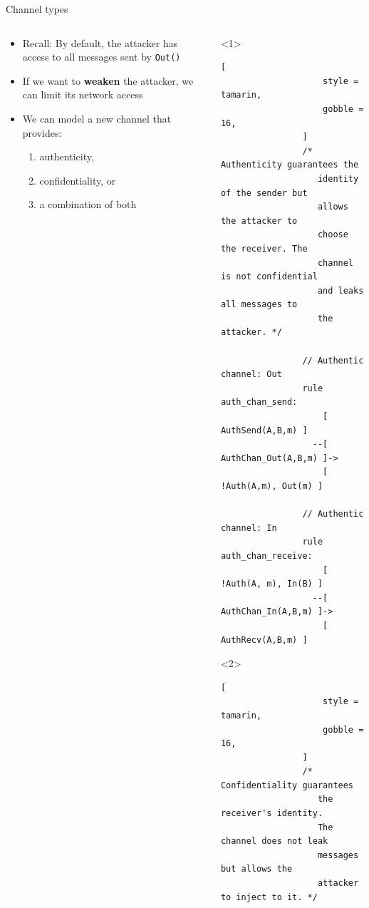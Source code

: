 \documentclass[11pt,aspectratio=169]{beamer}
\begin{document}
\begin{frame}[t,fragile]{Channel types}
    \begin{columns}[T]
        \begin{column}{0.55\textwidth}
            \begin{itemize}
                \item Recall: By default, the attacker has access to all 
                      messages sent by \texttt{Out()}
                \item If we want to \textbf{weaken} the attacker, we can limit 
                      its network access
                \item We can model a new channel that provides:
                \begin{enumerate}
                    \item<1-> authenticity,
                    \item<2-> confidentiality, or
                    \item<3-> a combination of both
                \end{enumerate}
            \end{itemize}
        \end{column}
        \begin{column}{0.45\textwidth}
            \begin{onlyenv}<1>
                \begin{lstlisting}[
                    style = tamarin,
                    gobble = 16,
                ]
                /* Authenticity guarantees the
                   identity of the sender but 
                   allows the attacker to
                   choose the receiver. The
                   channel is not confidential
                   and leaks all messages to
                   the attacker. */

                // Authentic channel: Out
                rule auth_chan_send:
                    [ AuthSend(A,B,m) ]
                  --[ AuthChan_Out(A,B,m) ]->
                    [ !Auth(A,m), Out(m) ]
  
                // Authentic channel: In
                rule auth_chan_receive:
                    [ !Auth(A, m), In(B) ]
                  --[ AuthChan_In(A,B,m) ]->
                    [ AuthRecv(A,B,m) ]
                \end{lstlisting}
            \end{onlyenv}
            \begin{onlyenv}<2>
                \begin{lstlisting}[
                    style = tamarin,
                    gobble = 16,
                ]
                /* Confidentiality guarantees
                   the receiver's identity.
                   The channel does not leak
                   messages but allows the
                   attacker to inject to it. */


\end{lstlisting}
\end{onlyenv}
\end{column}
\end{columns}
\end{frame}
\end{document}
